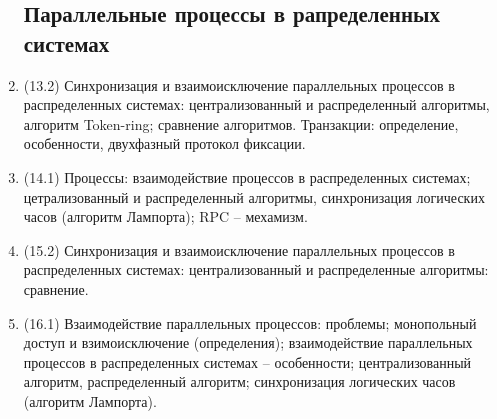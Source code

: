 \documentclass[a4paper,14pt]{extreport}
\begin{document}
\begin{enumerate}
\subsection{Параллельные процессы в рапределенных системах}
    \item (13.2) Синхронизация и взаимоисключение параллельных
        процессов в распределенных системах: централизованный и распределенный
        алгоритмы, алгоритм Token-ring; сравнение алгоритмов. Транзакции:
        определение, особенности, двухфазный протокол фиксации.
    \item (14.1) Процессы: взаимодействие процессов в распределенных
        системах; цетрализованный и распределенный алгоритмы,
        синхронизация логических часов (алгоритм Лампорта); RPC --
        мехамизм.
    \item (15.2) Синхронизация и взаимоисключение параллельных
        процессов в распределенных системах: централизованный и распределенные
        алгоритмы: сравнение.
    \item (16.1) Взаимодействие параллельных процессов: проблемы; монопольный
        доступ и взимоисключение (определения); взаимодействие параллельных
        процессов в распределенных системах -- особенности;
        централизованный алгоритм, распределенный алгоритм;
        синхронизация логических часов (алгоритм Лампорта).


\end{enumerate}
\end{document}
